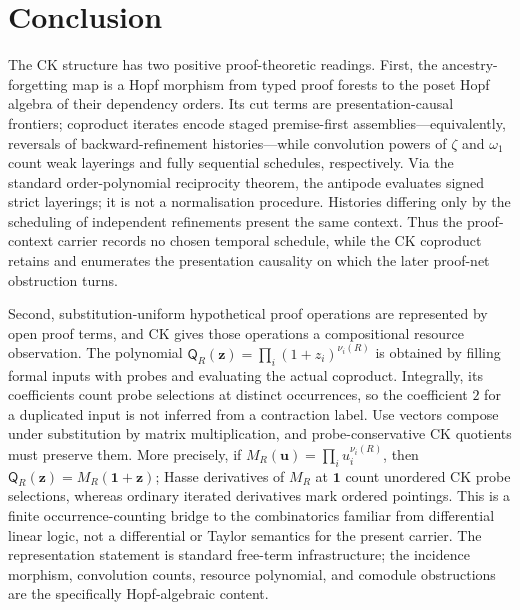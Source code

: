 \documentclass[10pt,a4paper]{article}
\theoremstyle{plain}
\theoremstyle{definition}
\theoremstyle{remark}
\begin{document}
\section{Conclusion}

The CK structure has two positive proof-theoretic readings.  First, the
ancestry-forgetting map is a Hopf morphism from typed proof forests to the
poset Hopf algebra of their dependency orders.  Its cut terms are
presentation-causal frontiers; coproduct iterates encode staged premise-first
assemblies---equivalently, reversals of backward-refinement histories---while
convolution powers of \(\zeta\) and \(\omega_1\) count weak layerings and
fully sequential schedules, respectively.  Via the standard
order-polynomial reciprocity theorem, the antipode evaluates signed strict
layerings; it is not a normalisation procedure.  Histories differing only by
the scheduling of independent refinements present the same context.  Thus
the proof-context carrier records no chosen temporal schedule, while the CK
coproduct retains and enumerates the presentation causality on which the
later proof-net obstruction turns.

Second, substitution-uniform hypothetical proof operations are represented by
open proof terms, and CK gives those operations a compositional resource
observation.  The polynomial
\(\mathsf Q_R(\mathbf z)=\prod_i(1+z_i)^{\nu_i(R)}\) is obtained by filling
formal inputs with probes and evaluating the actual coproduct.  Integrally,
its coefficients count probe selections at distinct occurrences, so the
coefficient \(2\) for a duplicated input is not inferred from a contraction
label.  Use vectors compose under
substitution by matrix multiplication, and probe-conservative CK quotients
must preserve them.  More precisely, if
\(M_R(\mathbf u)=\prod_i u_i^{\nu_i(R)}\), then
\(\mathsf Q_R(\mathbf z)=M_R(\mathbf 1+\mathbf z)\); Hasse derivatives of
\(M_R\) at \(\mathbf1\) count unordered CK probe selections, whereas
ordinary iterated derivatives mark ordered pointings.  This is a finite
occurrence-counting bridge to the combinatorics familiar from differential
linear logic, not a differential or Taylor semantics for the present
carrier.  The representation statement is standard free-term
infrastructure; the incidence morphism, convolution counts, resource
polynomial, and comodule obstructions are the specifically Hopf-algebraic
content.
\end{document}
